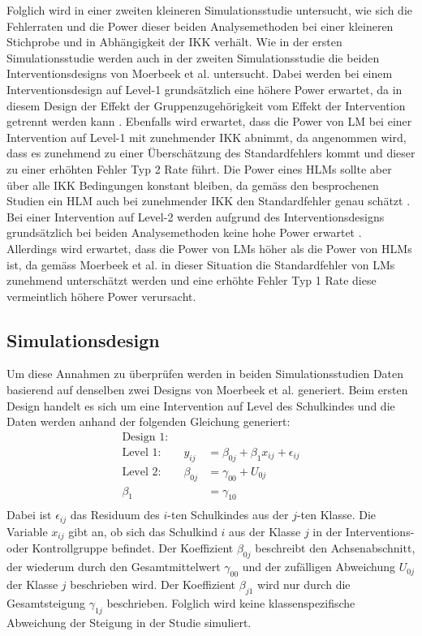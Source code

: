 \documentclass[12pt]{article}\usepackage[]{graphicx}\usepackage[]{color}
\begin{document}
Folglich wird in einer zweiten kleineren Simulationsstudie untersucht, wie sich die Fehlerraten und die Power dieser beiden Analysemethoden bei einer kleineren Stichprobe und in Abhängigkeit der IKK verhält. Wie in der ersten Simulationsstudie werden auch in der zweiten Simulationsstudie die beiden Interventionsdesigns von Moerbeek et al. \citeyearpar{MOERBEEK2003341} untersucht. Dabei werden bei einem Interventionsdesign auf Level-1 grundsätzlich eine höhere Power erwartet, da in diesem Design der Effekt der Gruppenzugehörigkeit vom Effekt der Intervention getrennt werden kann \citep{moerbeek2000design}. Ebenfalls wird erwartet, dass die Power von LM bei einer Intervention auf Level-1 mit zunehmender IKK abnimmt, da angenommen wird, dass es zunehmend zu einer Überschätzung des Standardfehlers kommt und dieser zu einer erhöhten Fehler Typ 2 Rate führt. Die Power eines HLMs sollte aber über alle IKK Bedingungen konstant bleiben, da gemäss den besprochenen Studien ein HLM auch bei zunehmender IKK den Standardfehler genau schätzt \citep{mcneish2014analyzing}. Bei einer Intervention auf Level-2 werden aufgrund des Interventionsdesigns grundsätzlich bei beiden Analysemethoden keine hohe Power erwartet \citep{moerbeek2000design}. Allerdings wird erwartet, dass die Power von LMs höher als die Power von HLMs ist, da gemäss Moerbeek et al. \citeyearpar{MOERBEEK2003341} in dieser Situation die Standardfehler von LMs zunehmend unterschätzt werden und eine erhöhte Fehler Typ 1 Rate diese vermeintlich höhere Power verursacht.

\subsection{Simulationsdesign} \label{section:sim_design}
Um diese Annahmen zu überprüfen werden in beiden Simulationsstudien Daten basierend auf denselben zwei Designs von Moerbeek et al. \citeyearpar{MOERBEEK2003341} generiert. Beim ersten Design handelt es sich um eine Intervention auf Level des Schulkindes und die Daten werden anhand der folgenden Gleichung generiert:
\begin{equation} 
\begin{split}
\text{Design 1:}\\	
 \text{Level 1:}  \qquad y_{ij} & = \beta_{0j} + \beta_{1}x_{ij} + \epsilon_{ij}\\
 \text{Level 2:} \qquad \beta_{0j} & = \gamma_{00} + U_{0j}\\
 \beta_{1} & = \gamma_{10}\\
 \end{split}	
\end{equation} 
Dabei ist $\epsilon_{ij}$ das Residuum des $i$-ten Schulkindes aus der $j$-ten Klasse. Die Variable $x_{ij}$ gibt an, ob sich das Schulkind $i$ aus der Klasse $j$ in der Interventions- oder Kontrollgruppe befindet. Der Koeffizient $\beta_{0j}$ beschreibt den Achsenabschnitt, der wiederum durch den Gesamtmittelwert $\gamma_{00}$ und der zufälligen Abweichung $U_{0j}$ der Klasse $j$ beschrieben wird. Der Koeffizient $\beta_{j1}$ wird nur durch die Gesamtsteigung $\gamma_{1j}$ beschrieben. Folglich wird keine klassenspezifische Abweichung der Steigung in der Studie simuliert.
\end{document}
